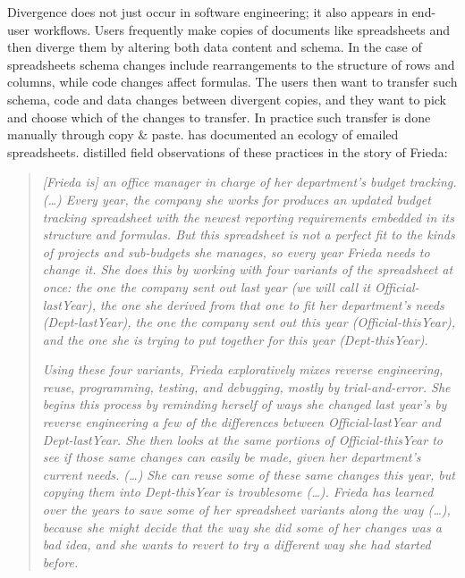 \documentclass[english,submission]{programming}
\begin{document}
Divergence does not just occur in software engineering; it also appears in end-user
workflows. Users frequently make copies of documents like spreadsheets and then
diverge them by altering both data content and schema. In the case of spreadsheets schema
changes include rearrangements to the structure of rows and columns, while code changes affect
formulas. The users then want to transfer such schema, code and data changes between
divergent copies, and they want to pick and choose which of the changes to transfer.
In practice such transfer is done manually through copy \& paste. \citet{Basman19} has
documented an ecology of emailed spreadsheets. \citet{Burnett14} distilled field observations
of these practices in the story of Frieda:

\begin{quotation}
\setlength{\parskip}{0.5em}
\setlength{\parindent}{0em}

\noindent
\emph{[Frieda is] an office manager in charge of her department's budget
tracking. (\ldots) Every year, the company she works for produces an updated budget tracking
spreadsheet with the newest reporting requirements embedded in its structure and formulas.
But this spreadsheet is not a perfect fit to the kinds of projects and sub-budgets she manages,
so every year Frieda needs to change it. She does this by working with four variants of the
spreadsheet at once: the one the company sent out last year (we will call it Official-lastYear),
the one she derived from that one to fit her department's needs (Dept-lastYear), the one the
company sent out this year (Official-thisYear), and the one she is trying to put together
for this year (Dept-thisYear).}

\emph{Using these four variants, Frieda exploratively mixes reverse engineering, reuse,
programming, testing, and debugging, mostly by trial-and-error. She begins this process by
reminding herself of ways she changed last year's by reverse engineering a few of the
differences between Official-lastYear and Dept-lastYear. She then looks at the same portions
of Official-thisYear to see if those same changes can easily be made, given her department's
current needs.
(\ldots)
She can reuse some of these same changes this year, but copying them into Dept-thisYear
is troublesome (\ldots). Frieda has learned over the years to
save some of her spreadsheet variants along the way (\ldots),
because she might decide that the way she did some of her changes was a bad idea, and she
wants to revert to try a different way she had started before.}
\end{quotation}
\end{document}

